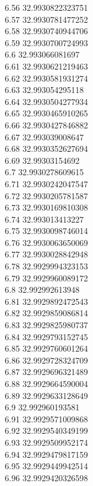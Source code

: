 {6.56	32.9930822323751\\
6.57	32.9930781477252\\
6.58	32.9930740944706\\
6.59	32.9930700724993\\
6.6	32.993066081697\\
6.61	32.9930621219463\\
6.62	32.9930581931274\\
6.63	32.993054295118\\
6.64	32.9930504277934\\
6.65	32.9930465910265\\
6.66	32.9930427846882\\
6.67	32.993039008647\\
6.68	32.9930352627694\\
6.69	32.99303154692\\
6.7	32.9930278609615\\
6.71	32.9930242047547\\
6.72	32.9930205781587\\
6.73	32.9930169810308\\
6.74	32.993013413227\\
6.75	32.9930098746014\\
6.76	32.9930063650069\\
6.77	32.9930028842948\\
6.78	32.9929994323153\\
6.79	32.9929960089172\\
6.8	32.992992613948\\
6.81	32.9929892472543\\
6.82	32.9929859086814\\
6.83	32.9929825980737\\
6.84	32.9929793152745\\
6.85	32.9929760601264\\
6.86	32.9929728324709\\
6.87	32.9929696321489\\
6.88	32.9929664590004\\
6.89	32.9929633128649\\
6.9	32.992960193581\\
6.91	32.9929571009868\\
6.92	32.9929540349199\\
6.93	32.9929509952174\\
6.94	32.9929479817159\\
6.95	32.9929449942514\\
6.96	32.9929420326598\\
}
